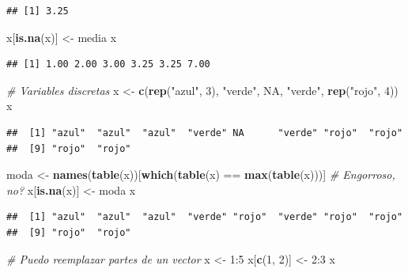 \documentclass[]{article}
\newenvironment{Shaded}{\begin{snugshade}}{\end{snugshade}}
\newcommand{\KeywordTok}[1]{\textcolor[rgb]{0.13,0.29,0.53}{\textbf{{#1}}}}
\newcommand{\DecValTok}[1]{\textcolor[rgb]{0.00,0.00,0.81}{{#1}}}
\newcommand{\StringTok}[1]{\textcolor[rgb]{0.31,0.60,0.02}{{#1}}}
\newcommand{\CommentTok}[1]{\textcolor[rgb]{0.56,0.35,0.01}{\textit{{#1}}}}
\newcommand{\OtherTok}[1]{\textcolor[rgb]{0.56,0.35,0.01}{{#1}}}
\newcommand{\NormalTok}[1]{{#1}}
\begin{document}
\begin{verbatim}
## [1] 3.25
\end{verbatim}

\begin{Shaded}
\begin{Highlighting}[]
\NormalTok{x[}\KeywordTok{is.na}\NormalTok{(x)] <-}\StringTok{ }\NormalTok{media}
\NormalTok{x}
\end{Highlighting}
\end{Shaded}

\begin{verbatim}
## [1] 1.00 2.00 3.00 3.25 3.25 7.00
\end{verbatim}

\begin{Shaded}
\begin{Highlighting}[]
\CommentTok{# Variables discretas}
\NormalTok{x <-}\StringTok{ }\KeywordTok{c}\NormalTok{(}\KeywordTok{rep}\NormalTok{(}\StringTok{"azul"}\NormalTok{, }\DecValTok{3}\NormalTok{), }\StringTok{"verde"}\NormalTok{, }\OtherTok{NA}\NormalTok{, }\StringTok{"verde"}\NormalTok{, }\KeywordTok{rep}\NormalTok{(}\StringTok{"rojo"}\NormalTok{, }\DecValTok{4}\NormalTok{))}
\NormalTok{x}
\end{Highlighting}
\end{Shaded}

\begin{verbatim}
##  [1] "azul"  "azul"  "azul"  "verde" NA      "verde" "rojo"  "rojo" 
##  [9] "rojo"  "rojo"
\end{verbatim}

\begin{Shaded}
\begin{Highlighting}[]
\NormalTok{moda <-}\StringTok{ }\KeywordTok{names}\NormalTok{(}\KeywordTok{table}\NormalTok{(x))[}\KeywordTok{which}\NormalTok{(}\KeywordTok{table}\NormalTok{(x) ==}\StringTok{ }\KeywordTok{max}\NormalTok{(}\KeywordTok{table}\NormalTok{(x)))] }\CommentTok{# Engorroso, no?}
\NormalTok{x[}\KeywordTok{is.na}\NormalTok{(x)] <-}\StringTok{ }\NormalTok{moda}
\NormalTok{x}
\end{Highlighting}
\end{Shaded}

\begin{verbatim}
##  [1] "azul"  "azul"  "azul"  "verde" "rojo"  "verde" "rojo"  "rojo" 
##  [9] "rojo"  "rojo"
\end{verbatim}

\begin{Shaded}
\begin{Highlighting}[]
\CommentTok{# Puedo reemplazar partes de un vector}
\NormalTok{x <-}\StringTok{ }\DecValTok{1}\NormalTok{:}\DecValTok{5}
\NormalTok{x[}\KeywordTok{c}\NormalTok{(}\DecValTok{1}\NormalTok{, }\DecValTok{2}\NormalTok{)] <-}\StringTok{ }\DecValTok{2}\NormalTok{:}\DecValTok{3}
\NormalTok{x}
\end{Highlighting}
\end{Shaded}
\end{document}
